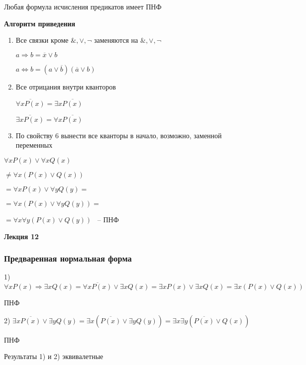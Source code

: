 \documentclass[russian]{lecture-notes}
\begin{document}
    \begin{theorem}
        Любая формула исчисления предикатов имеет ПНФ
    \end{theorem}

    \textbf{Алгоритм приведения}

    \begin{enumerate}
        \item{
            Все связки кроме $\&, \lor, \neg$ заменяются на $\&, \lor, \neg$

            $a \Rightarrow b = \overline{x} \lor b$

            $a \Leftrightarrow b = (a \lor \overline{b})(\overline{a} \lor b)$
        }

        \item{
            Все отрицания внутри кванторов

            $\overline{\forall x P(x)} = \exists x \overline{P(x)}$

            $\overline{\exists x P(x)} = \forall x \overline{P(x)}$
        }

        \item{
            По свойству 6 вынести все кванторы в начало, возможно, заменной переменных
        }
    \end{enumerate}


    \begin{example}
        $\forall x P(x) \lor \forall x Q(x)$

        $\neq \forall x (P(x) \lor Q(x))$

        $ = \forall x P(x) \lor \forall y Q(y) = $

        $= \forall x (P(x) \lor \forall y Q(y)) = $

        $= \forall x \forall y (P(x) \lor Q(y))$ ~-- ПНФ
    \end{example}
     \textbf{Лекция 12}

    \subsubsection{Предваренная нормальная форма}

    \begin{example}

        1) $\forall x P(x) \Rightarrow \exists x Q(x) = \overline{\forall x P(x)} \lor \exists x Q(x)
        = \exists x P(x) \lor \exists x Q(x) = \exists x
        ( P(x) \lor Q(x))$

    \quad ПНФ

        2) $\exists x \overline{P(x)} \lor \exists y Q(y) = \exists x (\overline{P(x)} \lor \exists y Q(y)) =
        \exists x \exists y (\overline{P(x)} \lor Q(x))$

    \qquad \qquad \qquad \qquad \qquad \qquad \qquad \qquad \qquad \qquad \qquad ПНФ

        Результаты 1) и 2) эквивалетные

    \end{example}
\end{document}
